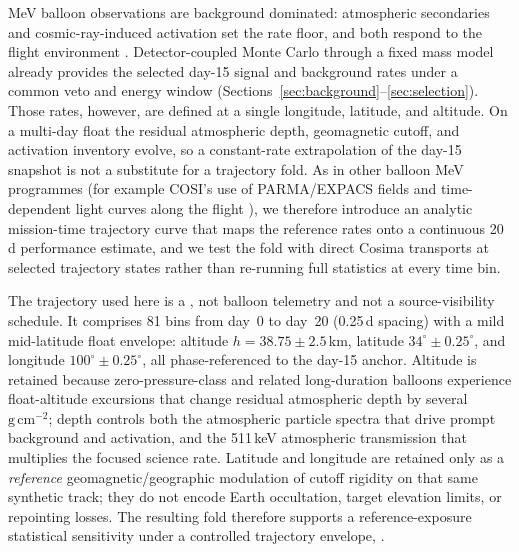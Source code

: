 \documentclass[11pt]{article}
\begin{document}
MeV balloon observations are background dominated: atmospheric secondaries and cosmic-ray-induced activation set the rate floor, and both respond to the flight environment \cite{Gallego2025Balloon,Kierans2017}. Detector-coupled Monte Carlo through a fixed mass model already provides the selected day-15 signal and background rates under a common veto and energy window (Sections~\ref{sec:background}--\ref{sec:selection}). Those rates, however, are defined at a single longitude, latitude, and altitude. On a multi-day float the residual atmospheric depth, geomagnetic cutoff, and activation inventory evolve, so a constant-rate extrapolation of the day-15 snapshot is not a substitute for a trajectory fold. As in other balloon MeV programmes (for example COSI's use of PARMA/EXPACS fields and time-dependent light curves along the flight \cite{Gallego2025Balloon}), we therefore introduce an analytic mission-time trajectory curve that maps the reference rates onto a continuous 20\,d performance estimate, and we test the fold with direct Cosima transports at selected trajectory states rather than re-running full statistics at every time bin.

The trajectory used here is a \emph{}, not balloon telemetry and not a source-visibility schedule. It comprises 81 bins from day~0 to day~20 (0.25\,d spacing) with a mild mid-latitude float envelope: altitude $h=38.75\pm2.5$\,km, latitude $34^\circ\pm0.25^\circ$, and longitude $100^\circ\pm0.25^\circ$, all phase-referenced to the day-15 anchor. Altitude is retained because zero-pressure-class and related long-duration balloons experience float-altitude excursions that change residual atmospheric depth by several $\mathrm{g\,cm^{-2}}$; depth controls both the atmospheric particle spectra that drive prompt background and activation, and the 511\,keV atmospheric transmission that multiplies the focused science rate. Latitude and longitude are retained only as a \emph{reference} geomagnetic/geographic modulation of cutoff rigidity on that same synthetic track; they do not encode Earth occultation, target elevation limits, or repointing losses. The resulting fold therefore supports a reference-exposure statistical sensitivity under a controlled trajectory envelope, .
\end{document}
